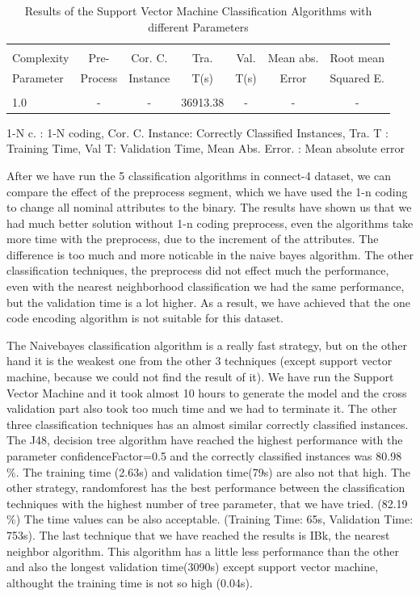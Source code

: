 \documentclass[a4paper]{article}
\begin{document}
\begin{table}
\begin{tabular}{|l| c | c | c | c |c |c |}

\hline & & & & & & \\
Complexity & Pre- &  Cor. C. & Tra. & Val. & Mean abs.  & Root mean \\
Parameter & Process & Instance & T(s) &  T(s) & Error & Squared E. \\
\hline & & & & & & \\
1.0 & - &		  - &		36913.38	& 	-	 & 	-	 &  - \\ 
\hline
\end{tabular}

\caption{Results of the Support Vector Machine Classification Algorithms with different Parameters}
	 1-N c. : 1-N coding,
	Cor. C. Instance:  Correctly Classified Instances,
	Tra. T : Training Time,
	Val T: Validation Time,
	Mean Abs. Error. : Mean absolute error 
\end{table}

After we have run the 5 classification algorithms in connect-4 dataset, we can compare the effect of the preprocess segment, which we have used the 1-n coding to change all nominal attributes to the binary. The results have shown us that we had much better solution without 1-n coding preprocess, even the algorithms take more time with the preprocess, due to the increment of the attributes. The difference is too much and more noticable in the naive bayes algorithm. The other classification techniques, the preprocess did not effect much the performance, even with the nearest neighborhood classification we had the same performance, but the validation time is a lot higher. As a result, we have achieved that the one code encoding algorithm is not suitable for this dataset. 


The Naivebayes classification algorithm is a really fast strategy, but on the other hand it is the weakest one from the other 3 techniques (except support vector machine, because we could not find the result of it). We have run the Support Vector Machine and it took almost 10 hours to generate the model and the cross validation part also took too much time and we had to terminate it. The other three classification techniques has an almost similar correctly classified instances. The J48, decision tree algorithm have reached the highest performance with the parameter confidenceFactor=0.5 and the correctly classified instances was 80.98 $\%$. The training time (2.63s) and validation time(79s) are also not that high. The other strategy, randomforest has the best performance between the classification techniques with the highest number of tree parameter, that we have tried. (82.19 $\%$) The time values can be also acceptable. (Training Time: 65s, Validation Time: 753s). The last technique that we have reached the results is IBk, the nearest neighbor algorithm. This algorithm has a little less performance than the other and also the longest validation time(3090s)  except support vector machine, althought the training time is not so high (0.04s).
\end{document}
